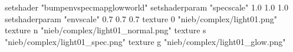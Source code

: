 setshader "bumpenvspecmapglowworld"
setshaderparam "specscale" 1.0 1.0 1.0
setshaderparam "envscale"  0.7 0.7 0.7
   texture 0 "nieb/complex/light01.png"
   texture n "nieb/complex/light01_normal.png"
   texture s "nieb/complex/light01_spec.png"
   texture g "nieb/complex/light01_glow.png"